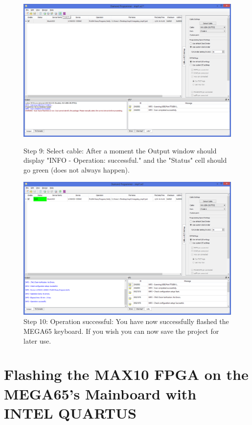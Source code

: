\begin{figure}[H]
  \centering
  \includegraphics[width=0.8\linewidth]{images/diamond09.png}
  \captionsetup{width=0.8\linewidth}
  \caption{Step 9: Select cable:
           After a moment the Output window should display
           "INFO - Operation: successful." and the "Status" cell should
           go green (does not always happen).}
  \label{fig:diamond09}

\vspace{5mm}

  \includegraphics[width=0.8\linewidth]{images/diamond10.png}
  \captionsetup{width=0.8\linewidth}
  \caption{Step 10: Operation successful:
           You have now successfully flashed the MEGA65 keyboard.
           If you wish you can now save the project for later use.}
  \label{fig:diamond10}
\end{figure}


\section{Flashing the MAX10 FPGA on the MEGA65's Mainboard with INTEL QUARTUS}

